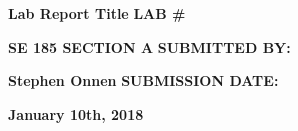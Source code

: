 \documentclass{article}
\begin{document}

\begin{titlepage} 
\begin{center}
\vspace*{\fill}
%
%
\Huge\textbf{Lab Report Title}
\vskip 0.5in
%
%
\large\textbf{LAB \#} \par
\Large\textbf{SE 185 SECTION A}
\vskip 0.5in
\large\textbf{SUBMITTED BY:} \par
%
%
\LARGE\textbf{Stephen Onnen}
\vskip 0.5in
\large\textbf{SUBMISSION DATE:} \par
%
%
\LARGE\textbf{January 10th, 2018}
\vspace*{\fill}
\end{center}
\end{titlepage}
\end{document}
